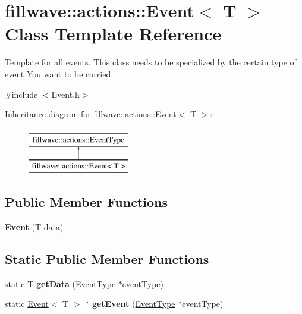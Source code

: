 \hypertarget{classfillwave_1_1actions_1_1Event}{}\section{fillwave\+:\+:actions\+:\+:Event$<$ T $>$ Class Template Reference}
\label{classfillwave_1_1actions_1_1Event}


Template for all events. This class needs to be specialized by the certain type of event You want to be carried.  




{\ttfamily \#include $<$Event.\+h$>$}

Inheritance diagram for fillwave\+:\+:actions\+:\+:Event$<$ T $>$\+:\begin{figure}[H]
\begin{center}
\leavevmode
\includegraphics[height=2.000000cm]{classfillwave_1_1actions_1_1Event}
\end{center}
\end{figure}
\subsection*{Public Member Functions}
\begin{DoxyCompactItemize}
\item 
\hypertarget{classfillwave_1_1actions_1_1Event_a6169d5fd6bfb41c60831b91294504b05}{}{\bfseries Event} (T data)\label{classfillwave_1_1actions_1_1Event_a6169d5fd6bfb41c60831b91294504b05}

\end{DoxyCompactItemize}
\subsection*{Static Public Member Functions}
\begin{DoxyCompactItemize}
\item 
\hypertarget{classfillwave_1_1actions_1_1Event_a817aeb52af71ead58bd052be5ffae3ee}{}static T {\bfseries get\+Data} (\hyperlink{classfillwave_1_1actions_1_1EventType}{Event\+Type} $\ast$event\+Type)\label{classfillwave_1_1actions_1_1Event_a817aeb52af71ead58bd052be5ffae3ee}

\item 
\hypertarget{classfillwave_1_1actions_1_1Event_aab62154289dcbab43daa2fe26985ab23}{}static \hyperlink{classfillwave_1_1actions_1_1Event}{Event}$<$ T $>$ $\ast$ {\bfseries get\+Event} (\hyperlink{classfillwave_1_1actions_1_1EventType}{Event\+Type} $\ast$event\+Type)\label{classfillwave_1_1actions_1_1Event_aab62154289dcbab43daa2fe26985ab23}

\end{DoxyCompactItemize}


